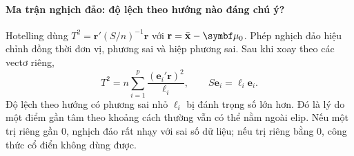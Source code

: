 \paragraph{Ma trận nghịch đảo: độ lệch theo hướng nào đáng chú ý?}
Hotelling dùng $T^2=\mathbf r'(S/n)^{-1}\mathbf r$ với
$\mathbf r=\xbar-\vmu_0$. Phép nghịch đảo hiệu chỉnh đồng thời đơn vị,
phương sai và hiệp phương sai. Sau khi xoay theo các vectơ riêng,
\[
 T^2=n\sum_{i=1}^p\frac{(\mathbf e_i'\mathbf r)^2}{\ell_i},
 \qquad S\mathbf e_i=\ell_i\mathbf e_i.
\]
Độ lệch theo hướng có phương sai nhỏ $\ell_i$ bị đánh trọng số lớn hơn.
Đó là lý do một điểm gần tâm theo khoảng cách thường vẫn có thể nằm
ngoài elip. Nếu một trị riêng gần 0, nghịch đảo rất nhạy với sai số dữ
liệu; nếu trị riêng bằng 0, công thức cổ điển không dùng được.

